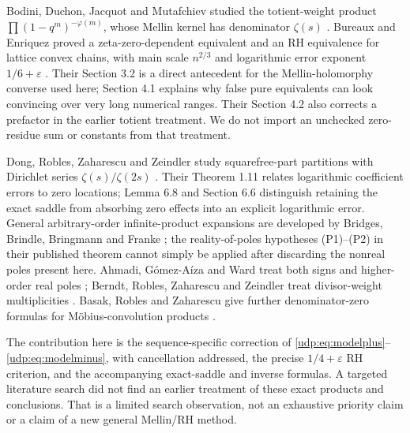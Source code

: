 \documentclass[11pt]{article}
\theoremstyle{remark}\newtheorem{remark}[theorem]{Remark}
\newcommand{\eps}{\varepsilon}
\numberwithin{equation}{section}
\begin{document}
Bodini, Duchon, Jacquot and Mutafchiev studied the totient-weight product $\prod(1-q^m)^{-\varphi(m)}$, whose Mellin kernel has denominator $\zeta(s)$ \cite{bodini}. Bureaux and Enriquez proved a zeta-zero-dependent equivalent and an RH equivalence for lattice convex chains, with main scale $n^{2/3}$ and logarithmic error exponent $1/6+\eps$ \cite{bureaux}. Their Section 3.2 is a direct antecedent for the Mellin-holomorphy converse used here; Section 4.1 explains why false pure equivalents can look convincing over very long numerical ranges. Their Section 4.2 also corrects a prefactor in the earlier totient treatment. We do not import an unchecked zero-residue sum or constants from that treatment.

Dong, Robles, Zaharescu and Zeindler study squarefree-part partitions with Dirichlet series $\zeta(s)/\zeta(2s)$ \cite{dong}. Their Theorem 1.11 relates logarithmic coefficient errors to zero locations; Lemma 6.8 and Section 6.6 distinguish retaining the exact saddle from absorbing zero effects into an explicit logarithmic error. General arbitrary-order infinite-product expansions are developed by Bridges, Brindle, Bringmann and Franke \cite{bridges}; the reality-of-poles hypotheses (P1)--(P2) in their published theorem cannot simply be applied after discarding the nonreal poles present here. Ahmadi, G\'omez-A\'iza and Ward treat both signs and higher-order real poles \cite{ahmadi}; Berndt, Robles, Zaharescu and Zeindler treat divisor-weight multiplicities \cite{berndt}. Basak, Robles and Zaharescu give further denominator-zero formulas for M\"obius-convolution products \cite{basak}.

The contribution here is the sequence-specific correction of \eqref{udp:eq:modelplus}--\eqref{udp:eq:modelminus}, with cancellation addressed, the precise $1/4+\eps$ RH criterion, and the accompanying exact-saddle and inverse formulas. A targeted literature search did not find an earlier treatment of these exact products and conclusions. That is a limited search observation, not an exhaustive priority claim or a claim of a new general Mellin/RH method.
\end{document}
